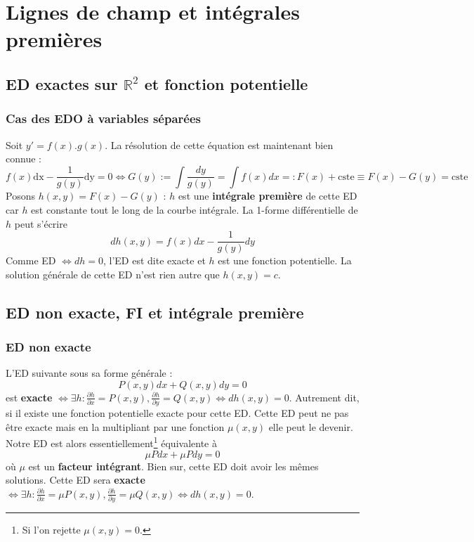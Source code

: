 \chapter{Lignes de champ et intégrales premières}
\section{ED exactes sur $\mathbb{R}^2$ et fonction potentielle}
	\subsection{Cas des EDO à variables séparées}
	Soit $y' = f(x).g(x)$. La résolution de cette équation est 
	maintenant bien connue :
	\begin{equation}
	f(x)\text{dx}-\frac{1}{g(y)}\text{dy} = 0 \Leftrightarrow 
	G(y) := \int\frac{dy}{g(y)}=\int f(x)dx =: F(x) + \text{cste} 
	\equiv F(x) - G(y) = \text{cste}
	\end{equation}
	Posons $h(x,y) = F(x) - G(y)$ : $h$ est une \textbf{intégrale 
	première} de cette ED car $h$ est constante tout le long de la 
	courbe intégrale. La 1-forme différentielle de $h$ peut s'écrire 
	\begin{equation}
	dh(x,y) = f(x)dx - \frac{1}{g(y)}dy
	\end{equation}
	Comme ED $\Leftrightarrow dh = 0$, l'ED est dite exacte et 
	$h$ est une fonction potentielle. La solution générale de cette 
	ED n'est rien autre que $h(x,y)=c$.
	
\section{ED non exacte, FI et intégrale première}
	\subsection{ED non exacte}
	L'ED suivante sous sa forme générale :
	\begin{equation}
	P(x,y)dx + Q(x,y)dy = 0
	\end{equation}
	est \textbf{exacte} $\displaystyle\Leftrightarrow \exists h : 
	\frac{\partial h}{\partial x} = P(x,y), \frac{\partial h}{
	\partial y} = Q(x,y) \Leftrightarrow dh(x,y)=0$. Autrement dit, 
	si il existe une fonction potentielle exacte pour cette ED. 
	Cette ED peut ne pas être exacte mais en la multipliant par une 
	fonction $\mu(x,y)$ elle peut le devenir. Notre ED est alors 
	essentiellement\footnote{Si l'on rejette $\mu(x,y)=0$.} 
	équivalente à
	\begin{equation}
	\mu Pdx + \mu Pdy = 0
	\end{equation}
	où $\mu$ est un \textbf{facteur intégrant}. Bien sur, cette ED 
	doit avoir les mêmes solutions. Cette ED 
	sera \textbf{exacte} $\displaystyle\Leftrightarrow \exists h : 
	\frac{\partial h}{\partial x} = \mu P(x,y), \frac{\partial h}{
	\partial y} = \mu Q(x,y) \Leftrightarrow dh(x,y)=0$.

